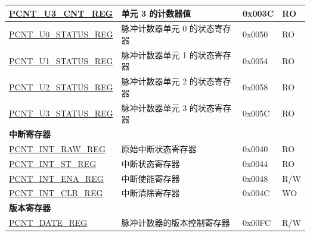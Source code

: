 \begin{longtable}{ | p{6cm} | p{7.2cm} | p{1.3cm} | p{1cm} | }
\hyperref[regdesc:PCNTUNCNTREG]{PCNT\_U3\_CNT\_REG} & 单元 3 的计数器值 & 0x003C & RO \\ \hline
\hyperref[regdesc:PCNTUNSTATUSREG]{PCNT\_U0\_STATUS\_REG} & 脉冲计数器单元 0 的状态寄存器 & 0x0050 & RO \\ \hline
\hyperref[regdesc:PCNTUNSTATUSREG]{PCNT\_U1\_STATUS\_REG} & 脉冲计数器单元 1 的状态寄存器 & 0x0054 & RO \\ \hline
\hyperref[regdesc:PCNTUNSTATUSREG]{PCNT\_U2\_STATUS\_REG} & 脉冲计数器单元 2 的状态寄存器 & 0x0058 & RO \\ \hline
\hyperref[regdesc:PCNTUNSTATUSREG]{PCNT\_U3\_STATUS\_REG} & 脉冲计数器单元 3 的状态寄存器 & 0x005C & RO \\ \hline
\multicolumn{4}{|l|}{\textbf{中断寄存器}} \\ \hline
\hyperref[regdesc:PCNTINTRAWREG]{PCNT\_INT\_RAW\_REG} & 原始中断状态寄存器 & 0x0040 & RO \\ \hline
\hyperref[regdesc:PCNTINTSTREG]{PCNT\_INT\_ST\_REG} & 中断状态寄存器 & 0x0044 & RO \\ \hline
\hyperref[regdesc:PCNTINTENAREG]{PCNT\_INT\_ENA\_REG} & 中断使能寄存器 & 0x0048 & R/W \\ \hline
\hyperref[regdesc:PCNTINTCLRREG]{PCNT\_INT\_CLR\_REG} & 中断清除寄存器 & 0x004C & WO \\ \hline
\multicolumn{4}{|l|}{\textbf{版本寄存器}} \\ \hline
\hyperref[regdesc:PCNTDATEREG]{PCNT\_DATE\_REG} & 脉冲计数器的版本控制寄存器 & 0x00FC & R/W \\ \hline
\end{longtable}
